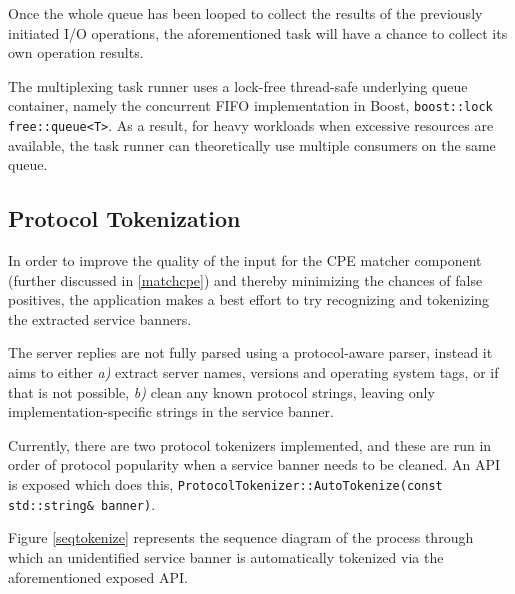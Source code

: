 \documentclass[a4paper,12pt]{article}
\begin{document}
	Once the whole queue has been looped to collect the results of the previously initiated I/O operations, the aforementioned task will have a chance to collect its own operation results.
	
	The multiplexing task runner uses a lock-free thread-safe underlying queue container, namely the concurrent FIFO implementation in Boost, \texttt{boost::lock free::queue<T>}. As a result, for heavy workloads when excessive resources are available, the task runner can theoretically use multiple consumers on the same queue.
	
\subsection{Protocol Tokenization} \label{tokenizer}
 
	
	In order to improve the quality of the input for the CPE matcher component (further discussed in \ref{matchcpe}) and thereby minimizing the chances of false positives, the application makes a best effort to try recognizing and tokenizing the extracted service banners.
	
	The server replies are not fully parsed using a protocol-aware parser, instead it aims to either \textit{a)} extract server names, versions and operating system tags, or if that is not possible, \textit{b)} clean any known protocol strings, leaving only implementation-specific strings in the service banner.
	
	Currently, there are two protocol tokenizers implemented, and these are run in order of protocol popularity when a service banner needs to be cleaned. An API is exposed which does this, \texttt{ProtocolTokenizer::AutoTokenize(const std::string& banner)}.
	
	Figure \ref{seqtokenize} represents the sequence diagram of the process through which an unidentified service banner is automatically tokenized via the aforementioned exposed API.
	
\end{document}
